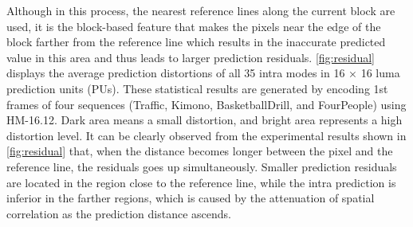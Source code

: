 \documentclass[journal]{IEEEtran}
\begin{document}
Although in this process, the nearest reference lines along the current block are used, it is the block-based feature that makes the pixels near the edge of the block farther from the reference line which results in the inaccurate predicted value in this area and thus leads to larger prediction residuals. \autoref{fig:residual} displays the average prediction distortions of all 35 intra modes in 16 × 16 luma prediction units (PUs)\cite{08}. These statistical results are generated by encoding 1st frames of four sequences (Traffic, Kimono, BasketballDrill, and FourPeople) using HM-16.12. Dark area means a small distortion, and bright area represents a high distortion level. It can be clearly observed from the experimental results shown in \autoref{fig:residual} that, when the distance becomes longer between the pixel and the reference line, the residuals goes up simultaneously. Smaller prediction residuals are located in the region close to the reference line, while the intra prediction is inferior in the farther regions, which is caused by the attenuation of spatial correlation as the prediction distance ascends.
\end{document}

